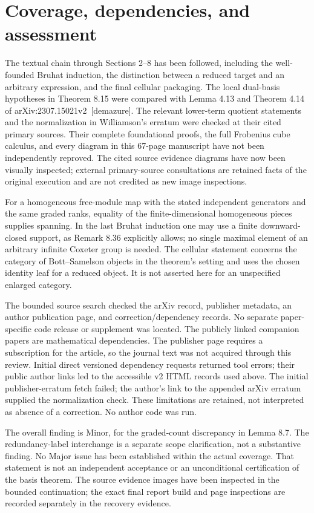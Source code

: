 \documentclass[10pt]{article}
\begin{document}
\section*{Coverage, dependencies, and assessment}
The textual chain through Sections 2–8 has been followed, including the well-founded Bruhat induction, the distinction between a reduced target and an arbitrary expression, and the final cellular packaging. The local dual-basis hypotheses in Theorem 8.15 were compared with Lemma 4.13 and Theorem 4.14 of arXiv:2307.15021v2 [demazure]. The relevant lower-term quotient statements and the normalization in Williamson’s erratum were checked at their cited primary sources. Their complete foundational proofs, the full Frobenius cube calculus, and every diagram in this 67-page manuscript have not been independently reproved. The cited source evidence diagrams have now been visually inspected; external primary-source consultations are retained facts of the original execution and are not credited as new image inspections.\par
For a homogeneous free-module map with the stated independent generators and the same graded ranks, equality of the finite-dimensional homogeneous pieces supplies spanning. In the last Bruhat induction one may use a finite downward-closed support, as Remark 8.36 explicitly allows; no single maximal element of an arbitrary infinite Coxeter group is needed. The cellular statement concerns the category of Bott–Samelson objects in the theorem’s setting and uses the chosen identity leaf for a reduced object. It is not asserted here for an unspecified enlarged category.\par
The bounded source search checked the arXiv record, publisher metadata, an author publication page, and correction/dependency records. No separate paper-specific code release or supplement was located. The publicly linked companion papers are mathematical dependencies. The publisher page requires a subscription for the article, so the journal text was not acquired through this review. Initial direct versioned dependency requests returned tool errors; their public author links led to the accessible v2 HTML records used above. The initial publisher-erratum fetch failed; the author’s link to the appended arXiv erratum supplied the normalization check. These limitations are retained, not interpreted as absence of a correction. No author code was run.\par
The overall finding is Minor, for the graded-count discrepancy in Lemma 8.7. The redundancy-label interchange is a separate scope clarification, not a substantive finding. No Major issue has been established within the actual coverage. That statement is not an independent acceptance or an unconditional certification of the basis theorem. The source evidence images have been inspected in the bounded continuation; the exact final report build and page inspections are recorded separately in the recovery evidence.\par
\end{document}
